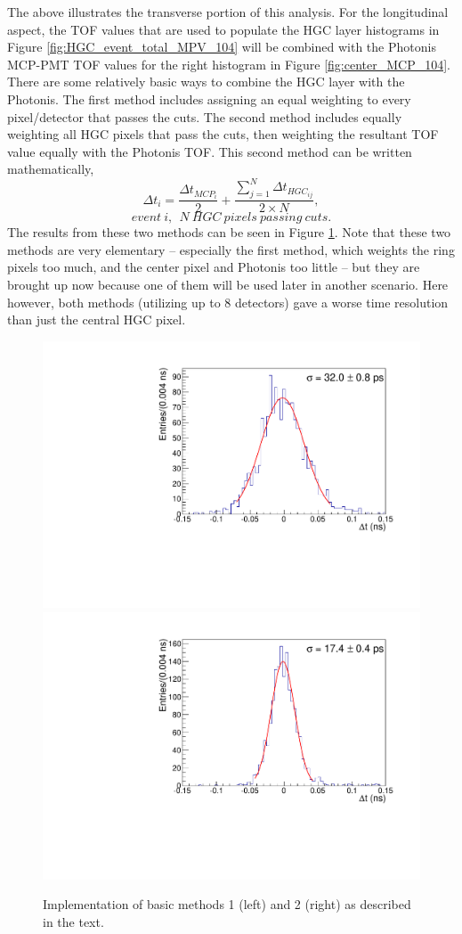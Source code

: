 \documentclass[twocolumn,aps,prd,reprint,superscriptaddress,floatfix]{revtex4-1}
\begin{document}
The above illustrates the transverse portion of this analysis. 
For the longitudinal aspect, the TOF values that are used to populate the HGC layer histograms in Figure \ref{fig:HGC_event_total_MPV_104} will be combined with the Photonis MCP-PMT TOF values for the right histogram in Figure \ref{fig:center_MCP_104}.
There are some relatively basic ways to combine the HGC layer with the Photonis.
The first method includes assigning an equal weighting to every pixel/detector that passes the cuts.
The second method includes equally weighting all HGC pixels that pass the cuts, then weighting the resultant TOF value equally with the Photonis TOF.
This second method can be written mathematically,
\[
\Delta t_i = \dfrac{ \Delta t_{MCP_i} }{2} + \dfrac{\sum\limits_{j=1}^N \Delta t_{HGC_{ij}} }{2\times N},
\]
\[
event\ i,\ \ N\ HGC\ pixels\ passing\ cuts.
\]
The results from these two methods can be seen in Figure \ref{fig:m12}. 
Note that these two methods are very elementary -- especially the first method, which weights the ring pixels too much, and the center pixel and Photonis too little -- but they are brought up now because one of them will be used later in another scenario. 
Here however, both methods (utilizing up to 8 detectors) gave a worse time resolution than just the central HGC pixel.

\begin{figure}[!htbp]
\centering
	\includegraphics[width=.49\textwidth]{deltaT_PicoSil_MCP_Equal104.pdf}
	\includegraphics[width=.49\textwidth]{deltaT_PicoSilEqual_MCP_Equal104.pdf}
	\caption{Implementation of basic methods 1 (left) and 2 (right) as described in the text. }
	\label{fig:m12}
\end{figure}
\end{document}
